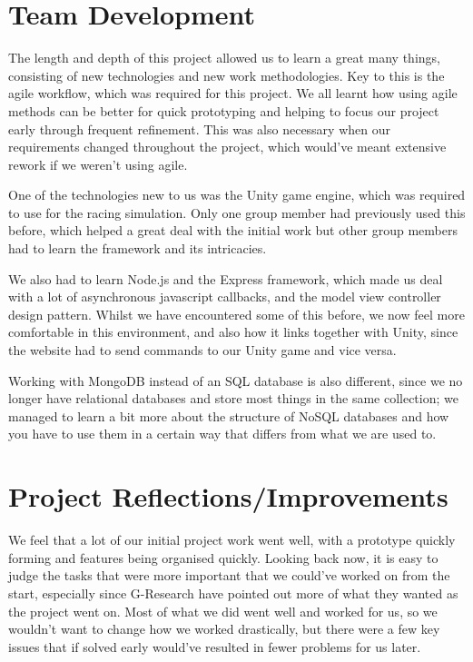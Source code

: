 \section{Team Development}

The length and depth of this project allowed us to learn a great many things, consisting of new technologies and new work methodologies. Key to this is the agile workflow, which was required for this project. We all learnt how using agile methods can be better for quick prototyping and helping to focus our project early through frequent refinement. This was also necessary when our requirements changed throughout the project, which would've meant extensive rework if we weren't using agile.

One of the technologies new to us was the Unity game engine, which was required to use for the racing simulation. Only one group member had previously used this before, which helped a great deal with the initial work but other group members had to learn the framework and its intricacies. 

We also had to learn Node.js and the Express framework, which made us deal with a lot of asynchronous javascript callbacks, and the model view controller design pattern. Whilst we have encountered some of this before, we now feel more comfortable in this environment, and also how it links together with Unity, since the website had to send commands to our Unity game and vice versa.

Working with MongoDB instead of an SQL database is also different, since we no longer have relational databases and store most things in the same collection; we managed to learn a bit more about the structure of NoSQL databases and how you have to use them in a certain way that differs from what we are used to.

\section{Project Reflections/Improvements}

We feel that a lot of our initial project work went well, with a prototype quickly forming and features being organised quickly. Looking back now, it is easy to judge the tasks that were more important that we could've worked on from the start, especially since G-Research have pointed out more of what they wanted as the project went on. Most of what we did went well and worked for us, so we wouldn't want to change how we worked drastically, but there were a few key issues that if solved early would've resulted in fewer problems for us later.

